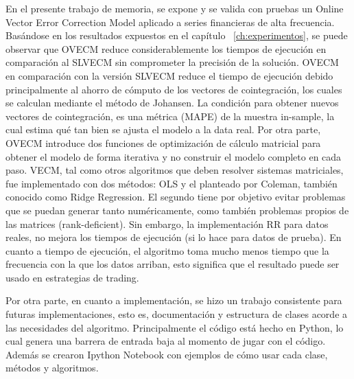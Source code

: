 En el presente trabajo de memoria, se expone y se valida con pruebas un  Online
Vector Error Correction Model aplicado a series financieras de alta frecuencia.
Basándose en los resultados expuestos en el capítulo ~\ref{ch:experimentos}, se
puede observar que OVECM reduce considerablemente los tiempos de ejecución en
comparación al SLVECM sin comprometer la precisión de la solución. OVECM en
comparación con la versión SLVECM reduce el tiempo de ejecución debido
principalmente al ahorro de cómputo de los vectores de cointegración, los
cuales se calculan mediante el método de Johansen. La condición para obtener
nuevos vectores de cointegración, es una métrica (MAPE) de la muestra
in-sample, la cual estima qué tan bien se ajusta el modelo a la data real. Por
otra parte, OVECM introduce dos funciones de optimización de cálculo matricial
para obtener el modelo de forma iterativa y no construir el modelo completo en
cada paso.  VECM, tal como otros algoritmos que deben resolver sistemas
matriciales, fue implementado con dos métodos: OLS y el planteado por Coleman,
también conocido como Ridge Regression. El segundo tiene por objetivo evitar
problemas que se puedan generar tanto numéricamente, como también problemas
propios de las matrices (rank-deficient). Sin embargo, la implementación RR
para datos reales, no mejora los tiempos de ejecución (si lo hace para datos de
prueba). En cuanto a tiempo de ejecución, el algoritmo toma mucho menos tiempo
que la frecuencia con la que los datos arriban, esto significa que el resultado
puede ser usado en estrategias de trading.

Por otra parte, en cuanto a implementación, se hizo un trabajo consistente para
futuras implementaciones, esto es, documentación y estructura de clases acorde
a las necesidades del algoritmo. Principalmente el código está hecho en Python,
lo cual genera una barrera de entrada baja al momento de jugar con el código.
Además se crearon Ipython Notebook con ejemplos de cómo usar cada clase,
métodos y algoritmos.

\newpage
